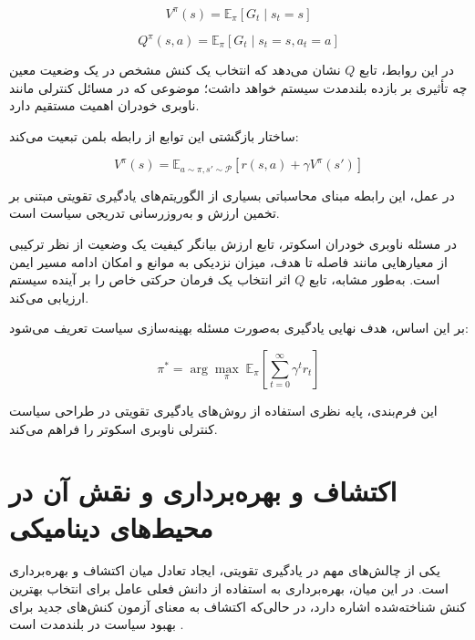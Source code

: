 \begin{equation}\label{state_value_function}
	V^\pi(s) = \mathbb{E}_\pi [G_t \mid s_t = s]
\end{equation}

\begin{equation}\label{action_value_function}
	Q^\pi(s,a) = \mathbb{E}_\pi [G_t \mid s_t = s, a_t = a]
\end{equation}

در این روابط، تابع $Q$ نشان می‌دهد که انتخاب یک کنش مشخص در یک وضعیت معین چه تأثیری بر بازده بلندمدت سیستم خواهد داشت؛ موضوعی که در مسائل کنترلی مانند ناوبری خودران اهمیت مستقیم دارد.

ساختار بازگشتی این توابع از رابطه بلمن
 تبعیت می‌کند:

\begin{equation}\label{bellman_equation}
	V^\pi(s) = 
	\mathbb{E}_{a \sim \pi, s' \sim \mathcal{P}}
	\left[
	r(s,a) + \gamma V^\pi(s')
	\right]
\end{equation}

در عمل، این رابطه مبنای محاسباتی بسیاری از الگوریتم‌های یادگیری تقویتی مبتنی بر تخمین ارزش و به‌روزرسانی تدریجی سیاست است.

در مسئله ناوبری خودران اسکوتر، تابع ارزش بیانگر کیفیت یک وضعیت از نظر ترکیبی از معیارهایی مانند فاصله تا هدف، میزان نزدیکی به موانع و امکان ادامه مسیر ایمن است. به‌طور مشابه، تابع $Q$ اثر انتخاب یک فرمان حرکتی خاص را بر آینده سیستم ارزیابی می‌کند.

بر این اساس، هدف نهایی یادگیری به‌صورت مسئله بهینه‌سازی سیاست تعریف می‌شود:

\begin{equation}
	\pi^* = \arg\max_\pi \;
	\mathbb{E}_\pi \left[ \sum_{t=0}^{\infty} \gamma^t r_t \right]
\end{equation}

این فرم‌بندی، پایه نظری استفاده از روش‌های یادگیری تقویتی در طراحی سیاست کنترلی ناوبری اسکوتر را فراهم می‌کند.
\section{اکتشاف و بهره‌برداری و نقش آن در محیط‌های دینامیکی}

یکی از چالش‌های مهم در یادگیری تقویتی، ایجاد تعادل میان اکتشاف%
و بهره‌برداری%
است. در این میان، بهره‌برداری به استفاده از دانش فعلی عامل برای انتخاب بهترین کنش شناخته‌شده اشاره دارد، در حالی‌که اکتشاف به معنای آزمون کنش‌های جدید برای بهبود سیاست در بلندمدت است \cite{SuttonBarto2018}.

